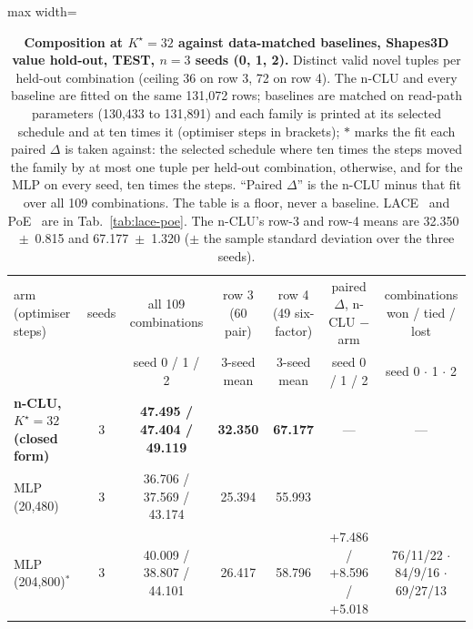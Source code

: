 \documentclass{article} %
\newcommand{\Kstar}{\ensuremath{K^{\star}}}
\begin{document}
\begin{table}[t]
\centering\small
\caption{\textbf{Composition at $\Kstar=32$ against data-matched baselines, Shapes3D value hold-out, TEST, $n=3$
seeds (0, 1, 2).} Distinct valid novel tuples per held-out combination (ceiling 36 on row 3, 72 on row 4). The n-CLU %
and every baseline are fitted on the same 131,072 rows; baselines are matched on read-path parameters %
(130,433 to 131,891) and each family is printed at its selected schedule and at ten times it %
(optimiser steps in brackets); $\ast$ marks the fit each paired $\Delta$ is taken against: the
selected schedule where ten times the steps moved the family by at most one tuple per held-out combination,
otherwise, and for the MLP on every seed, ten times the steps. ``Paired $\Delta$'' is the n-CLU minus
that fit over all 109 combinations. The table is a floor, never a baseline. LACE~\citep{nie_controllable_2021} and PoE~\citep{hinton_training_2002} are in %
Tab.~\ref{tab:lace-poe}. The n-CLU's row-3 and row-4 means are 32.350~$\pm$~0.815 and 67.177~$\pm$~1.320 %
($\pm$ the sample standard deviation over the three seeds).}
\label{tab:t7}
\setlength{\tabcolsep}{3pt}
\begin{adjustbox}{max width=\linewidth}\begin{tabular}{lcccccc}
\toprule
arm (optimiser steps) & seeds & all 109 combinations & row 3 (60 pair) & row 4 (49 six-factor) & paired $\Delta$, n-CLU $-$ arm & combinations won / tied / lost \\ %
 & & seed 0 / 1 / 2 & 3-seed mean & 3-seed mean & seed 0 / 1 / 2 & seed 0 $\cdot$ 1 $\cdot$ 2 \\
\midrule
\textbf{n-CLU, $\Kstar=32$ (closed form)} & 3 & \textbf{47.495 / 47.404 / 49.119} & \textbf{32.350} & \textbf{67.177} & --- & --- \\
MLP (20,480) & 3 & 36.706 / 37.569 / 43.174 & 25.394 & 55.993 & & \\
MLP (204,800)$^\ast$ & 3 & 40.009 / 38.807 / 44.101 & 26.417 & 58.796 & +7.486 / +8.596 / +5.018 & 76/11/22 $\cdot$ 84/9/16 $\cdot$ 69/27/13 \\

\end{tabular}
\end{adjustbox}
\end{table}
\end{document}
